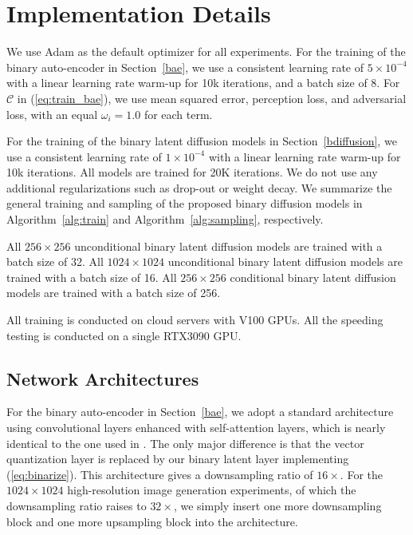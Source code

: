 \documentclass[10pt,twocolumn,letterpaper]{article}
\begin{document}
\section{Implementation Details}
\label{details}

We use Adam as the default optimizer for all experiments. 
For the training of the binary auto-encoder in Section~\ref{bae}, we use a consistent learning rate of $5\times 10^{-4}$ with a linear learning rate warm-up for 10k iterations, and a batch size of 8. 
For $\mathcal{C}$ in (\ref{eq:train_bae}), we use mean squared error, perception loss, and adversarial loss, with an equal $\omega_i = 1.0$ for each term.

For the training of the binary latent diffusion models in Section~\ref{bdiffusion}, we use a consistent learning rate of $1\times 10^{-4}$ with a linear learning rate warm-up for 10k iterations. 
All models are trained for 20K iterations. We do not use any additional regularizations such as drop-out or weight decay. We summarize the general training and sampling of the proposed binary diffusion models in Algorithm~\ref{alg:train} and Algorithm~\ref{alg:sampling}, respectively.

All $256\times256$ unconditional binary latent diffusion models are trained with a batch size of 32. 
All $1024\times1024$ unconditional binary latent diffusion models are trained with a batch size of 16. 
All $256\times256$ conditional binary latent diffusion models are trained with a batch size of 256.  

All training is conducted on cloud servers with V100 GPUs. All the speeding testing is conducted on a single RTX3090 GPU. 

\subsection{Network Architectures}

For the binary auto-encoder in Section~\ref{bae}, we adopt a standard architecture using convolutional layers enhanced with self-attention layers, which is nearly identical to the one used in \cite{vqgan}. The only major difference is that the vector quantization layer is replaced by our binary latent layer implementing (\ref{eq:binarize}). 
This architecture gives a downsampling ratio of $16\times$. For the $1024 \times 1024$ high-resolution image generation experiments, of which the downsampling ratio raises to $32\times$, we simply insert one more downsampling block and one more upsampling block into the architecture.
\end{document}
